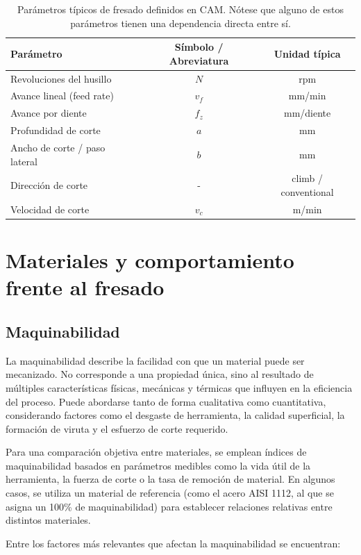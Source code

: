 {\begin{table}[h!]
	\centering
	\caption{Parámetros típicos de fresado definidos en CAM. Nótese que alguno de estos parámetros tienen una dependencia directa entre sí.}
	\begin{tabular}{|l|c|c|}
		\hline
		\textbf{Parámetro} & \textbf{Símbolo / Abreviatura} & \textbf{Unidad típica} \\
		\hline
		Revoluciones del husillo & $N$ & rpm \\
		Avance lineal (feed rate) & $v_f$ & mm/min \\
		Avance por diente & $f_z$ & mm/diente \\
		Profundidad de corte & $a$ & mm \\
		Ancho de corte / paso lateral & $b$ & mm \\
		Dirección de corte & - & climb / conventional \\
		Velocidad de corte & $v_c$ & m/min \\
		\hline
	\end{tabular}
	\label{tab:cam_params_fresado}
\end{table}


\section{Materiales y comportamiento frente al fresado}

\subsection{Maquinabilidad}

La maquinabilidad describe la facilidad con que un material puede ser mecanizado. No corresponde a una propiedad única, sino al resultado de múltiples características físicas, mecánicas y térmicas que influyen en la eficiencia del proceso. Puede abordarse tanto de forma cualitativa como cuantitativa, considerando factores como el desgaste de herramienta, la calidad superficial, la formación de viruta y el esfuerzo de corte requerido.

Para una comparación objetiva entre materiales, se emplean índices de maquinabilidad basados en parámetros medibles como la vida útil de la herramienta, la fuerza de corte o la tasa de remoción de material. En algunos casos, se utiliza un material de referencia (como el acero AISI 1112, al que se asigna un 100\% de maquinabilidad) para establecer relaciones relativas entre distintos materiales.

Entre los factores más relevantes que afectan la maquinabilidad se encuentran:

}
